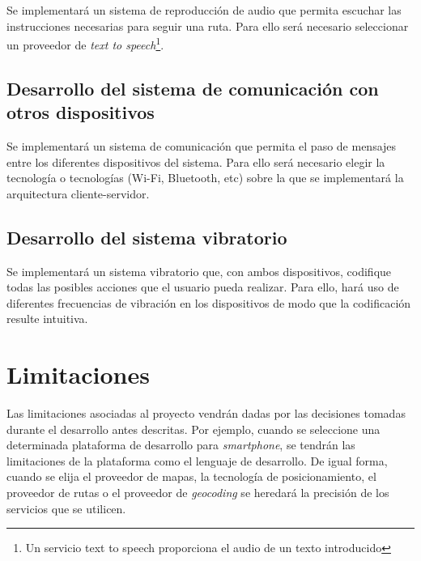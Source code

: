 Se implementará un sistema de reproducción de audio que permita escuchar las instrucciones
necesarias para seguir una ruta. Para ello será necesario seleccionar un proveedor de \emph{text to
  speech}\footnote{Un servicio text to speech proporciona el audio de un texto introducido}.

\subsection{Desarrollo del sistema de comunicación con otros dispositivos}

Se implementará un sistema de comunicación que permita el paso de mensajes entre los diferentes
dispositivos del sistema. Para ello será necesario elegir la tecnología o tecnologías (Wi-Fi,
Bluetooth, etc) sobre la que se implementará la arquitectura cliente-servidor.

\subsection{Desarrollo del sistema vibratorio}

Se implementará un sistema vibratorio que, con ambos dispositivos, codifique todas las posibles
acciones que el usuario pueda realizar. Para ello, hará uso de diferentes frecuencias de vibración en los dispositivos de modo que la codificación resulte intuitiva.

\section{Limitaciones}

Las limitaciones asociadas al proyecto vendrán dadas por las decisiones tomadas durante el
desarrollo antes descritas. Por ejemplo, cuando se seleccione una determinada plataforma de
desarrollo para \emph{smartphone}, se tendrán las limitaciones de la plataforma como el lenguaje de
desarrollo. De igual forma, cuando se elija el proveedor de mapas, la tecnología de posicionamiento,
el proveedor de rutas o el proveedor de \emph{geocoding} se heredará la precisión de los servicios
que se utilicen.

